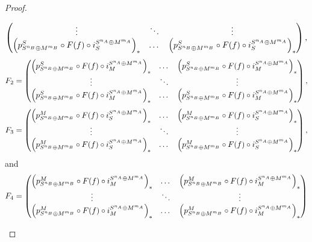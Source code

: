 \begin{proof}
\begin{enumerate}
{\[\begin{pmatrix}
                    \vdots & \ddots & \vdots \\
                    \left(  p_{S^{n_B} \oplus M^{m_B}}^S \circ F(f) \circ i_S^{S^{n_A} \oplus M^{m_A}}  \right)_* & \dots & \left(  p_{S^{n_B} \oplus M^{m_B}}^S \circ F(f) \circ i_S^{S^{n_A} \oplus M^{m_A}}  \right)_* \\
                \end{pmatrix},
            \]
            \[
                F_2 = \begin{pmatrix}
                    \left(  p_{S^{n_B} \oplus M^{m_B}}^S \circ F(f) \circ i_M^{S^{n_A} \oplus M^{m_A}}  \right)_* & \dots & \left(  p_{S^{n_B} \oplus M^{m_B}}^S \circ F(f) \circ i_M^{S^{n_A} \oplus M^{m_A}}  \right)_* \\
                    \vdots & \ddots & \vdots \\
                    \left(  p_{S^{n_B} \oplus M^{m_B}}^S \circ F(f) \circ i_M^{S^{n_A} \oplus M^{m_A}}  \right)_* & \dots & \left(  p_{S^{n_B} \oplus M^{m_B}}^S \circ F(f) \circ i_M^{S^{n_A} \oplus M^{m_A}}  \right)_* \\
                \end{pmatrix},
            \]
            \[
                F_3 = \begin{pmatrix}
                    \left(  p_{S^{n_B} \oplus M^{m_B}}^M \circ F(f) \circ i_S^{S^{n_A} \oplus M^{m_A}}  \right)_* & \dots & \left(  p_{S^{n_B} \oplus M^{m_B}}^M \circ F(f) \circ i_S^{S^{n_A} \oplus M^{m_A}}  \right)_* \\
                    \vdots & \ddots & \vdots \\
                    \left(  p_{S^{n_B} \oplus M^{m_B}}^M \circ F(f) \circ i_S^{S^{n_A} \oplus M^{m_A}}  \right)_* & \dots & \left(  p_{S^{n_B} \oplus M^{m_B}}^M \circ F(f) \circ i_S^{S^{n_A} \oplus M^{m_A}}  \right)_* \\
                \end{pmatrix},
            \]
            and
            \[
                F_4 = \begin{pmatrix}
                    \left(  p_{S^{n_B} \oplus M^{m_B}}^M \circ F(f) \circ i_M^{S^{n_A} \oplus M^{m_A}}  \right)_* & \dots & \left(  p_{S^{n_B} \oplus M^{m_B}}^M \circ F(f) \circ i_M^{S^{n_A} \oplus M^{m_A}}  \right)_* \\
                    \vdots & \ddots & \vdots \\
                    \left(  p_{S^{n_B} \oplus M^{m_B}}^M \circ F(f) \circ i_M^{S^{n_A} \oplus M^{m_A}}  \right)_* & \dots & \left(  p_{S^{n_B} \oplus M^{m_B}}^M \circ F(f) \circ i_M^{S^{n_A} \oplus M^{m_A}}  \right)_* \\

\end{pmatrix}\]}
\end{enumerate}
\end{proof}

